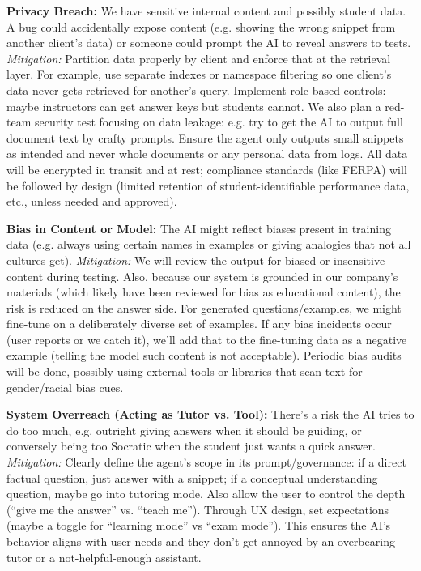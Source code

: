 \documentclass[11pt]{article}
\begin{document}
\textbf{Privacy Breach:} We have sensitive internal content and possibly student data. A bug could accidentally expose content (e.g. showing the wrong snippet from another client’s data) or someone could prompt the AI to reveal answers to tests. \textit{Mitigation:} Partition data properly by client and enforce that at the retrieval layer. For example, use separate indexes or namespace filtering so one client’s data never gets retrieved for another’s query. Implement role-based controls: maybe instructors can get answer keys but students cannot. We also plan a red-team security test focusing on data leakage: e.g. try to get the AI to output full document text by crafty prompts. Ensure the agent only outputs small snippets as intended and never whole documents or any personal data from logs. All data will be encrypted in transit and at rest; compliance standards (like FERPA) will be followed by design (limited retention of student-identifiable performance data, etc., unless needed and approved).

\textbf{Bias in Content or Model:} The AI might reflect biases present in training data (e.g. always using certain names in examples or giving analogies that not all cultures get). \textit{Mitigation:} We will review the output for biased or insensitive content during testing. Also, because our system is grounded in our company’s materials (which likely have been reviewed for bias as educational content), the risk is reduced on the answer side. For generated questions/examples, we might fine-tune on a deliberately diverse set of examples. If any bias incidents occur (user reports or we catch it), we’ll add that to the fine-tuning data as a negative example (telling the model such content is not acceptable). Periodic bias audits will be done, possibly using external tools or libraries that scan text for gender/racial bias cues.

\textbf{System Overreach (Acting as Tutor vs. Tool):} There's a risk the AI tries to do too much, e.g. outright giving answers when it should be guiding, or conversely being too Socratic when the student just wants a quick answer. \textit{Mitigation:} Clearly define the agent’s scope in its prompt/governance: if a direct factual question, just answer with a snippet; if a conceptual understanding question, maybe go into tutoring mode. Also allow the user to control the depth (“give me the answer” vs. “teach me”). Through UX design, set expectations (maybe a toggle for “learning mode” vs “exam mode”). This ensures the AI’s behavior aligns with user needs and they don’t get annoyed by an overbearing tutor or a not-helpful-enough assistant.
\end{document}
